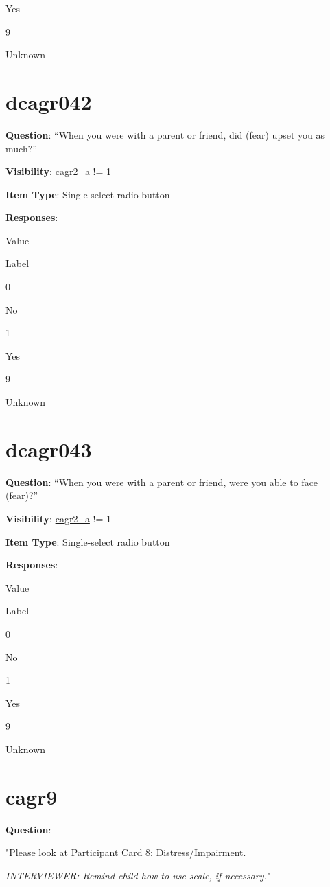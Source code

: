 \documentclass[]{book}
\begin{document}
Yes

9

Unknown

\hypertarget{dcagr042}{%
\section{dcagr042}\label{dcagr042}}

\textbf{Question}: ``When you were with a parent or friend, did (fear) upset you as much?''

\textbf{Visibility}: \protect\hyperlink{cagr2_a}{cagr2\_a} != 1

\textbf{Item Type}: Single-select radio button

\textbf{Responses}:

Value

Label

0

No

1

Yes

9

Unknown

\hypertarget{dcagr043}{%
\section{dcagr043}\label{dcagr043}}

\textbf{Question}: ``When you were with a parent or friend, were you able to face (fear)?''

\textbf{Visibility}: \protect\hyperlink{cagr2_a}{cagr2\_a} != 1

\textbf{Item Type}: Single-select radio button

\textbf{Responses}:

Value

Label

0

No

1

Yes

9

Unknown

\hypertarget{cagr9}{%
\section{cagr9}\label{cagr9}}

\textbf{Question}:

"Please look at Participant Card 8: Distress/Impairment.

\emph{INTERVIEWER: Remind child how to use scale, if necessary.}"
\end{document}
